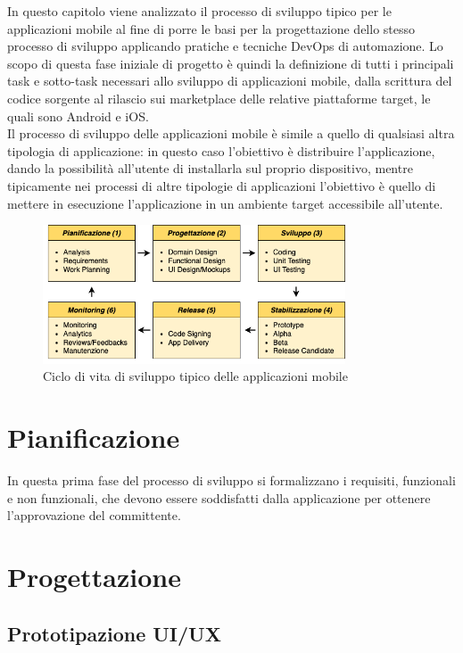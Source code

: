 
\parindent=0pt
In questo capitolo viene analizzato il processo di sviluppo tipico per le applicazioni mobile al fine di porre le basi per la progettazione dello stesso processo di sviluppo applicando pratiche e tecniche DevOps di automazione. Lo scopo di questa fase iniziale di progetto è quindi la definizione di tutti i principali task e sotto-task necessari allo sviluppo di applicazioni mobile, dalla scrittura del codice sorgente al rilascio sui marketplace delle relative piattaforme target, le quali sono Android e iOS.\\
Il processo di sviluppo delle applicazioni mobile è simile a quello di qualsiasi altra tipologia di applicazione: in questo caso l'obiettivo è distribuire l'applicazione, dando la possibilità all'utente di installarla sul proprio dispositivo, mentre tipicamente nei processi di altre tipologie di applicazioni l'obiettivo è quello di mettere in esecuzione l'applicazione in un ambiente target accessibile all'utente.

\begin{figure}[H]
\centering
\includegraphics[width=0.8\textwidth]{img/tesi-2-Page-9.drawio.png}
\caption{Ciclo di vita di sviluppo tipico delle applicazioni mobile}
\end{figure}

\section{Pianificazione} %
In questa prima fase del processo di sviluppo si formalizzano i requisiti, funzionali e non funzionali, che devono essere soddisfatti dalla applicazione per ottenere l'approvazione del committente. 


\section{Progettazione}
\subsection{Prototipazione UI/UX}
